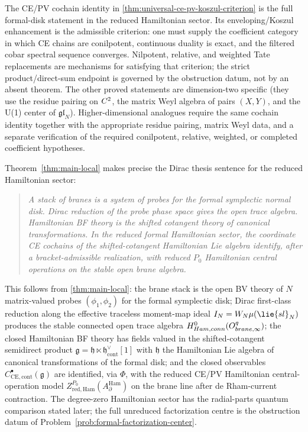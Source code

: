\documentclass[11pt]{memoir}
\begin{document}
\begin{rmk}
  The CE/PV cochain identity in
  \ref{thm:universal-ce-pv-koszul-criterion} is the full formal-disk
  statement in the reduced Hamiltonian sector.  Its enveloping/Koszul
  enhancement is the admissible criterion: one must supply the
  coefficient category in which CE chains are conilpotent, continuous
  duality is exact, and the filtered cobar spectral sequence converges.
  Nilpotent, relative, and weighted Tate replacements are mechanisms for
  satisfying that criterion; the strict product/direct-sum endpoint is
  governed by the obstruction datum, not by an absent theorem.
  The other proved statements are dimension-two specific (they use the
  residue pairing on $C^2$, the matrix Weyl algebra of pairs $(X,Y)$,
  and the U(1) center of $\mathfrak{gl}_N$). Higher-dimensional analogues
  require the same cochain identity together with the appropriate residue
  pairing, matrix Weyl data, and a separate verification of the required
  conilpotent, relative, weighted, or completed coefficient hypotheses.
\end{rmk}

\begin{rmk}\label{rmk:dirac-thesis}
  Theorem~\ref{thm:main-local} makes precise the Dirac
  thesis sentence for the reduced Hamiltonian sector:
  \begin{quote}
    \itshape
    A stack of branes is a system of probes for the formal symplectic
    normal disk. Dirac reduction of the probe phase space gives the
    open trace algebra. Hamiltonian BF theory is the shifted cotangent
    theory of canonical transformations. In the reduced formal Hamiltonian
    sector, the coordinate CE cochains of the shifted-cotangent
    Hamiltonian Lie algebra identify, after a bracket-admissible
    realization, with reduced \(P_0\) Hamiltonian central operations on
    the stable open brane algebra.
  \end{quote}
  This follows from \ref{thm:main-local}: the brane stack is
  the open BV theory of $N$ matrix-valued probes $(\phi_1,\phi_2)$ for
  the formal symplectic disk; Dirac first-class reduction along the
  effective traceless moment-map ideal
  $I_N=\mc W_N\widehat\mu(\lie{sl}_N)$ produces
  the stable connected open trace algebra
  $H^0_{Ham,conn}(O^{q}_{brane,\infty})$;
  the closed Hamiltonian BF theory has fields valued in the
  shifted-cotangent semidirect product
  $\mathfrak g=\mathfrak h\ltimes\mathfrak h^{\vee}_{\mathrm{cont}}[1]$
  with $\mathfrak h$ the Hamiltonian Lie algebra of canonical
  transformations of the formal disk; and the closed observables
  $C^{\bullet}_{\mathrm{CE},\mathrm{cont}}(\mathfrak g)$ are identified,
  via $\Phi$, with the reduced CE/PV Hamiltonian central-operation model
  \(Z^{P_0}_{\mathrm{red,Ham}}(A^{\mathrm{Ham}}_\partial)\) on the
  brane line after de Rham-current contraction.  The
  degree-zero Hamiltonian sector has the radial-parts quantum comparison
  stated later; the full unreduced factorization centre is the obstruction
  datum of Problem~\ref{prob:formal-factorization-center}.
\end{rmk}
\end{document}

